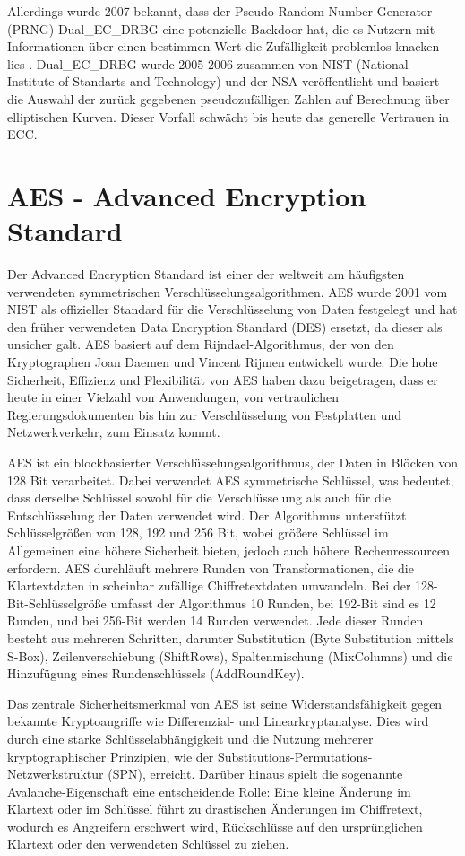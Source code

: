 \documentclass[11pt,a4paper]{scrreprt}
\begin{document}
Allerdings wurde 2007 bekannt, dass der Pseudo Random Number Generator (PRNG) Dual\_EC\_DRBG eine potenzielle Backdoor hat, die es Nutzern mit Informationen über einen bestimmen Wert die Zufälligkeit problemlos knacken lies \cite{ecc-green2013backdoor}. Dual\_EC\_DRBG wurde 2005-2006 zusammen von NIST (National Institute of Standarts and Technology) und der NSA veröffentlicht und basiert die Auswahl der zurück gegebenen pseudozufälligen Zahlen auf Berechnung über elliptischen Kurven. Dieser Vorfall schwächt bis heute das generelle Vertrauen in ECC. \cite{ecc-cloud2013elliptic}

\section{AES - Advanced Encryption Standard}
\label{sec:aes}
Der Advanced Encryption Standard ist einer der weltweit am häufigsten verwendeten symmetrischen Verschlüsselungsalgorithmen. AES wurde 2001 vom NIST als offizieller Standard für die Verschlüsselung von Daten festgelegt und hat den früher verwendeten Data Encryption Standard (DES) ersetzt, da dieser als unsicher galt. AES basiert auf dem Rijndael-Algorithmus, der von den Kryptographen Joan Daemen und Vincent Rijmen entwickelt wurde. Die hohe Sicherheit, Effizienz und Flexibilität von AES haben dazu beigetragen, dass er heute in einer Vielzahl von Anwendungen, von vertraulichen Regierungsdokumenten bis hin zur Verschlüsselung von Festplatten und Netzwerkverkehr, zum Einsatz kommt.

AES ist ein blockbasierter Verschlüsselungsalgorithmus, der Daten in Blöcken von 128 Bit verarbeitet. Dabei verwendet AES symmetrische Schlüssel, was bedeutet, dass derselbe Schlüssel sowohl für die Verschlüsselung als auch für die Entschlüsselung der Daten verwendet wird. Der Algorithmus unterstützt Schlüsselgrößen von 128, 192 und 256 Bit, wobei größere Schlüssel im Allgemeinen eine höhere Sicherheit bieten, jedoch auch höhere Rechenressourcen erfordern. AES durchläuft mehrere Runden von Transformationen, die die Klartextdaten in scheinbar zufällige Chiffretextdaten umwandeln. Bei der 128-Bit-Schlüsselgröße umfasst der Algorithmus 10 Runden, bei 192-Bit sind es 12 Runden, und bei 256-Bit werden 14 Runden verwendet. Jede dieser Runden besteht aus mehreren Schritten, darunter Substitution (Byte Substitution mittels S-Box), Zeilenverschiebung (ShiftRows), Spaltenmischung (MixColumns) und die Hinzufügung eines Rundenschlüssels (AddRoundKey).

Das zentrale Sicherheitsmerkmal von AES ist seine Widerstandsfähigkeit gegen bekannte Kryptoangriffe wie Differenzial- und Linearkryptanalyse. Dies wird durch eine starke Schlüsselabhängigkeit und die Nutzung mehrerer kryptographischer Prinzipien, wie der Substitutions-Permutations-Netzwerkstruktur (SPN), erreicht. Darüber hinaus spielt die sogenannte Avalanche-Eigenschaft eine entscheidende Rolle: Eine kleine Änderung im Klartext oder im Schlüssel führt zu drastischen Änderungen im Chiffretext, wodurch es Angreifern erschwert wird, Rückschlüsse auf den ursprünglichen Klartext oder den verwendeten Schlüssel zu ziehen.\\
\end{document}
